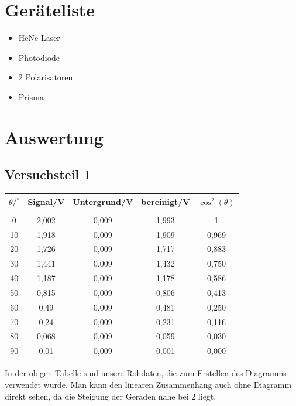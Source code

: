 \section{Geräteliste}
\begin{itemize}
\item HeNe Laser
\item Photodiode
\item 2 Polarisatoren
\item Prisma
\end{itemize}


\newpage

\section{Auswertung}

\subsection*{Versuchsteil 1}



\begin{center}
\begin{tabular}{c|c|c|c|c}
	$\theta/^\circ$ & Signal/V & Untergrund/V & bereinigt/V & $\cos^2(\theta)$ \\
	\hline
	&      &      &      &  \\
	0    & 2,002 & 0,009 & 1,993 & 1 \\
	10   & 1,918 & 0,009 & 1,909 & 0,969 \\
	20   & 1,726 & 0,009 & 1,717 & 0,883 \\
	30   & 1,441 & 0,009 & 1,432 & 0,750 \\
	40   & 1,187 & 0,009 & 1,178 & 0,586 \\
	50   & 0,815 & 0,009 & 0,806 & 0,413 \\
	60   & 0,49 & 0,009 & 0,481 & 0,250 \\
	70   & 0,24 & 0,009 & 0,231 & 0,116 \\
	80   & 0,068 & 0,009 & 0,059 & 0,030 \\
	90   & 0,01 & 0,009 & 0,001 & 0,000 \\
\end{tabular}	
\end{center}

In der obigen Tabelle sind unsere Rohdaten, die zum Erstellen des Diagramms verwendet wurde. Man kann den linearen Zusammenhang auch ohne Diagramm direkt sehen, da die Steigung der Geraden nahe bei 2 liegt.



